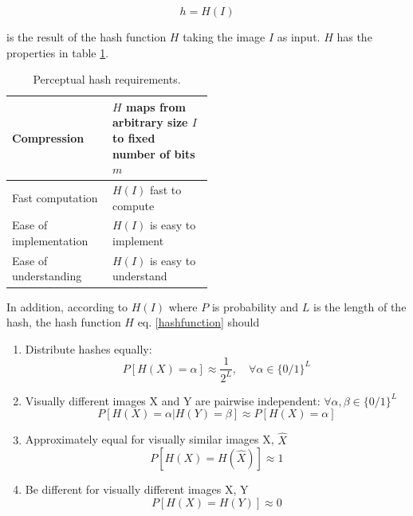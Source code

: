 \documentclass[english,12pt,a4paper,pdftex,elec,utf8]{aaltothesis}
\begin{document}
\begin{equation}\label{hashfunction}
h = H(I)
\end{equation}

is the result of the hash function $H$ taking the image $I$ as input. $H$ has the properties in table \ref{hashcriteria}.

\def\arraystretch{1.5}
\begin{table}[htb]
\caption{Perceptual hash requirements. \cite{Zauner2010}}
\label{hashcriteria}
\begin{center}
\begin{tabular}{lp{0.5\linewidth}}
  \hline \hline
  Compression & $H$ maps from arbitrary size $I$ to fixed number of bits $m$\\
  \hline
  Fast computation & $H(I)$ fast to compute \\
  \hline
  Ease of implementation & $H(I)$ is easy to implement\\
  \hline
  Ease of understanding & $H(I)$ is easy to understand\\
  \hline
\end{tabular}
\end{center}\end{table}


In addition, according to \cite{mihccak2001new} $H(I)$ where $P$ is probability and $L$ is the length of the hash, the hash function $H$ eq. \ref{hashfunction} should
\begin{enumerate}
\item Distribute hashes equally:\\
  \begin{equation}\label{phashdistribute}
  P[H(X)=\alpha]\approx\frac{1}{2^L},\quad\forall\alpha\in \{0/1\}^L
  \end{equation}
\item Visually different images X and Y are pairwise independent: $\forall\alpha,\beta\in\{0/1\}^L$\\
  \begin{equation}\label{phashindependent}
    P[H(X)=\alpha|H(Y)=\beta]\approx P[H(X)=\alpha]
  \end{equation}
\item Approximately equal for visually similar images X, $\hat{X}$\\
  \begin{equation}\label{phashsame}
    P[H(X) = H(\hat{X})] \approx 1
  \end{equation}

\item Be different for visually different images X, Y\\
  \begin{equation}\label{phashdif}
    P[H(X)=H(Y)]\approx 0
  \end{equation}
\end{enumerate}
\end{document}
